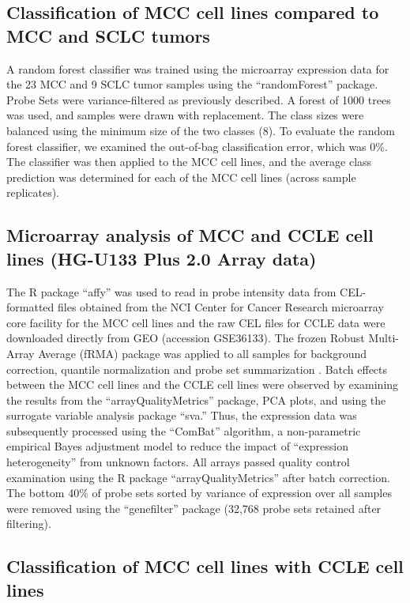 \documentclass[10pt]{article}
\begin{document}
\subsection*{Classification of MCC cell lines compared to MCC and SCLC tumors}

A random forest classifier was trained using the microarray expression data for the 23 MCC and 9 SCLC tumor samples using the ``randomForest'' package.
Probe Sets were variance-filtered as previously described.
A forest of 1000 trees was used, and samples were drawn with replacement.
The class sizes were balanced using the minimum size of the two classes (8).
To evaluate the random forest classifier, we examined the out-of-bag classification error, which was 0\%.
The classifier was then applied to the MCC cell lines, and the average class prediction was determined for each of the MCC cell lines (across sample replicates).

\subsection*{Microarray analysis of MCC and CCLE cell lines (HG-U133 Plus 2.0 Array data)}

The R package ``affy'' \citep{Gautier2004Affyanalysis} was used to read in probe intensity data from CEL-formatted files obtained from the NCI Center for Cancer Research microarray core facility for the MCC cell lines and the raw CEL files for CCLE data were downloaded directly from GEO (accession GSE36133).
The frozen Robust Multi-Array Average (fRMA) package was applied to all samples for background correction, quantile normalization and probe set summarization \citep{McCall2010Frozen}.
Batch effects between the MCC cell lines and the CCLE cell lines were observed by examining the results from the ``arrayQualityMetrics'' package, PCA plots, and using the surrogate variable analysis package ``sva.''
Thus, the expression data was subsequently processed using the ``ComBat'' algorithm, a non-parametric empirical Bayes adjustment model \citep{Johnson2007Adjusting} to reduce the impact of ``expression heterogeneity'' from unknown factors.
All arrays passed quality control examination using the R package ``arrayQualityMetrics'' after batch correction.
The bottom 40\% of probe sets sorted by variance of expression over all samples were removed using the ``genefilter'' package (32,768 probe sets retained after filtering).

\subsection*{Classification of MCC cell lines with CCLE cell lines}
\end{document}
